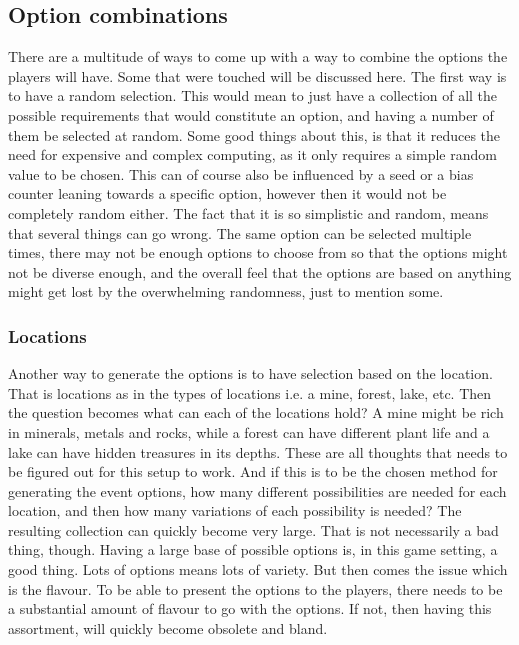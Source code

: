 \subsection{Option combinations}
There are a multitude of ways to come up with a way to combine the options the players will have. Some that were touched will be discussed here.
The first way is to have a random selection. This would mean to just have a collection of all the possible requirements that would constitute an option, and having a number of them be selected at random.
Some good things about this, is that it reduces the need for expensive and complex computing, as it only requires a simple random value to be chosen. This can of course also be influenced by a seed or a bias counter leaning towards a specific option, however then it would not be completely random either.
The fact that it is so simplistic and random, means that several things can go wrong. The same option can be selected multiple times, there may not be enough options to choose from so that the options might not be diverse enough, and the overall feel that the options are based on anything might get lost by the overwhelming randomness, just to mention some.

\subsubsection{Locations}
Another way to generate the options is to have selection based on the location. That is locations as in the types of locations i.e. a mine, forest, lake, etc. Then the question becomes what can each of the locations hold? A mine might be rich in minerals, metals and rocks, while a forest can have different plant life and a lake can have hidden treasures in its depths. These are all thoughts that needs to be figured out for this setup to work. And if this is to be the chosen method for generating the event options, how many different possibilities are needed for each location, and then how many variations of each possibility is needed? The resulting collection can quickly become very large. 
That is not necessarily a bad thing, though. Having a large base of possible options is, in this game setting, a good thing. Lots of options means lots of variety. But then comes the issue which is the flavour. To be able to present the options to the players, there needs to be a substantial amount of flavour to go with the options. If not, then having this assortment, will quickly become obsolete and bland.

